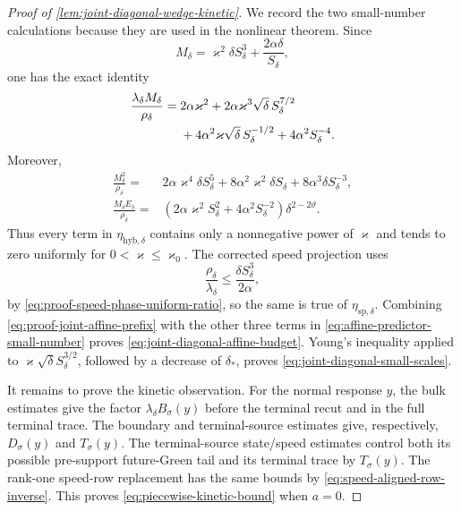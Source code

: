 \begin{proof}[Proof of
\cref{lem:joint-diagonal-wedge-kinetic}]
We record the two small-number calculations because they are used in the
nonlinear theorem.  Since
\[
 M_\delta=\varkappa^2\delta S_\delta^3
                  +\frac{2\alpha\delta}{S_\delta},
\]
one has the exact identity
\begin{align}
 \frac{\lambda_\delta M_\delta}{\rho_\delta}
 ={}&2\alpha\varkappa^2
 +2\alpha\varkappa^3\sqrt\delta\,S_\delta^{7/2}\notag\\
 &+4\alpha^2\varkappa\sqrt\delta\,S_\delta^{-1/2}
 +4\alpha^2S_\delta^{-4}.                       \label{eq:proof-joint-affine-prefix}
\end{align}
Moreover,
\begin{align*}
 \frac{M_\delta^2}{\rho_\delta}
 ={}&2\alpha\varkappa^4\delta S_\delta^5
   +8\alpha^2\varkappa^2\delta S_\delta
   +8\alpha^3\delta S_\delta^{-3},\\
 \frac{M_\delta E_\delta}{\rho_\delta}
 ={}&\left(2\alpha\varkappa^2S_\delta^2
              +4\alpha^2S_\delta^{-2}\right)
       \delta^{2-2\vartheta}.
\end{align*}
Thus every term in \(\eta_{\mathrm{hyb},\delta}\) contains only a
nonnegative power of \(\varkappa\) and tends to zero uniformly for
\(0<\varkappa\le\varkappa_0\).  The corrected speed projection uses
\[
 \frac{\rho_\delta}{\lambda_\delta}
 \le\frac{\delta S_\delta^3}{2\alpha},
\]
by \cref{eq:proof-speed-phase-uniform-ratio}, so the same is true of
\(\eta_{\mathrm{sp},\delta}\).  Combining
\cref{eq:proof-joint-affine-prefix} with the other three terms in
\cref{eq:affine-predictor-small-number} proves
\cref{eq:joint-diagonal-affine-budget}.  Young's inequality applied to
\(\varkappa\sqrt\delta S_\delta^{3/2}\), followed by a decrease of
\(\delta_*\), proves
\cref{eq:joint-diagonal-small-scales}.

It remains to prove the kinetic observation.  For the normal response
\(y\), the bulk estimates give the factor
\(\lambda_\delta B_\sigma(y)\) before the terminal recut and in the full
terminal trace.  The boundary and terminal-source estimates give,
respectively, \(D_\sigma(y)\) and \(T_\sigma(y)\).  The terminal-source
state/speed estimates control both its possible pre-support future-Green
tail and its terminal trace by \(T_\sigma(y)\).  The rank-one speed-row
replacement has the same bounds by
\cref{eq:speed-aligned-row-inverse}.  This proves
\cref{eq:piecewise-kinetic-bound} when \(a=0\).


\end{proof}
